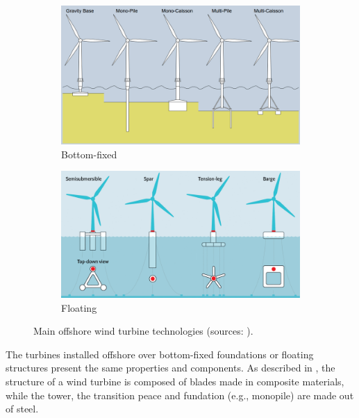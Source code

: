 \begin{figure}
    \begin{subfigure}[b]{0.48\textwidth}
        \centering
        \includegraphics[width=\linewidth]{./part1/figures/bottom_fixed_techno.png}
        \caption{Bottom-fixed}
        \label{fig:FOWT_bottomfixed}
    \end{subfigure}
    \begin{subfigure}[b]{0.48\textwidth}
        \centering
        \includegraphics[width=\linewidth]{./part1/figures/Floating-wind-platform-categories.png}
        \caption{Floating}
        \label{fig:FOWT_floating}
    \end{subfigure}
    \caption{Main offshore wind turbine technologies (sources: \citet{ahmed_2015_bottomfixed_image,mei_2021_FOWT_illustration}).}
\end{figure}



The turbines installed offshore over bottom-fixed foundations or floating structures present the same properties and components. 
As described in , the structure of a wind turbine is composed of blades made in composite materials, while the tower, the transition peace and fundation (e.g., monopile) are made out of steel. 


